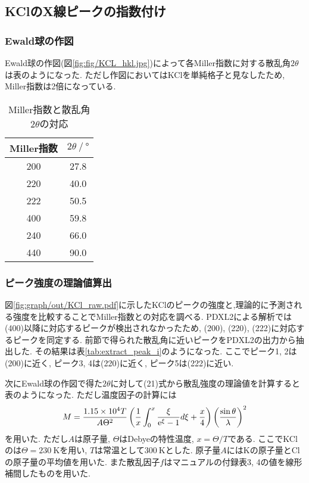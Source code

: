 \subsection{KClのX線ピークの指数付け}
\subsubsection{Ewald球の作図}
Ewald球の作図(図\ref{fig:fig/KCL_hkl.jpg})によって各Miller指数に対する散乱角$2\theta$は表のようになった.
ただし作図においてはKClを単純格子と見なしたため,
Miller指数は2倍になっている.

\begin{table}[h]
  \caption{Miller指数と散乱角$2\theta$の対応}
  \label{tab:miller_kclhkl}
  \centering
  \begin{tabular}{cc}
    \hline
    Miller指数&$2\theta\ /\ \si{\degree}$\\
    \hline \hline
    200&27.8\\
    220&40.0\\
    222&50.5\\
    400&59.8\\
    240&66.0\\
    440&90.0\\
    \hline
  \end{tabular}
\end{table}
\subsubsection{ピーク強度の理論値算出}
図\ref{fig:graph/out/KCl_raw.pdf}に示したKClのピークの強度と,理論的に予測される強度を比較することでMiller指数との対応を調べる.
PDXL2による解析では(400)以降に対応するピークが検出されなかったため,
(200), (220), (222)に対応するピークを同定する.
前節で得られた散乱角に近いピークをPDXL2の出力から抽出した.
その結果は表\ref{tab:extract_peak_i}のようになった.
ここでピーク1, 2は(200)に近く,
ピーク3, 4は(220)に近く,
ピーク5は(222)に近い.

次にEwald球の作図で得た$2\theta$に対して(21)式から散乱強度の理論値を計算すると表のようになった.
ただし温度因子の計算には
\begin{align}
  M=\frac{1.15\times10^4 T}{A\Theta^2}\left(\frac{1}{x}\int_0^x\frac{\xi}{{\rm e}^\xi-1}d\xi+\frac{x}{4}\right)\left(\frac{\sin\theta}{\lambda}\right)^2
\end{align}
を用いた.\cite{alma990007897430204034}
ただし$A$は原子量, $\Theta$はDebyeの特性温度, $x=\Theta/T$である.
ここでKClのは$\Theta=230\ \si{\kelvin}$を用い, $T$は常温として$300\ \si{\kelvin}$とした.\cite{2001167}
原子量$A$にはKの原子量とClの原子量の平均値を用いた.
また散乱因子$f$はマニュアルの付録表3, 4の値を線形補間したものを用いた.

